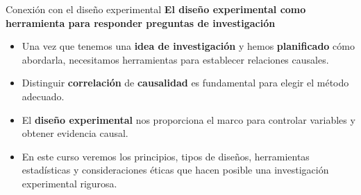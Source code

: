 ﻿\documentclass{beamer}
\begin{document}
\begin{frame}{Conexión con el diseño experimental}
   \centering
   \textbf{El diseño experimental como herramienta para responder preguntas de investigación}
   \vspace{0.4cm}

   \begin{itemize}
      \item Una vez que tenemos una \textbf{idea de investigación} y hemos \textbf{planificado} cómo abordarla, necesitamos herramientas para establecer relaciones causales.
      \item Distinguir \textbf{correlación} de \textbf{causalidad} es fundamental para elegir el método adecuado.
      \item El \textbf{diseño experimental} nos proporciona el marco para controlar variables y obtener evidencia causal.
      \item En este curso veremos los principios, tipos de diseños, herramientas estadísticas y consideraciones éticas que hacen posible una investigación experimental rigurosa.
   \end{itemize}
\end{frame}
\end{document}
